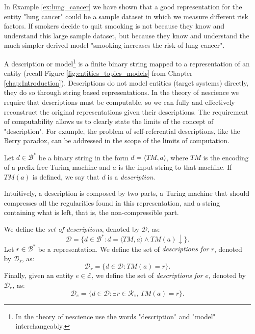 \begin{example}
In Example \ref{ex:lung_cancer} we have shown that a good representation for the entity "lung cancer" could be a sample dataset in which we measure different risk factors. If smokers decide to quit smooking is not because they know and understand this large sample dataset, but because they know and understand the much simpler derived model "smooking increases the risk of lung cancer".
\end{example}

A description or model\footnote{In the theory of nescience use the words "description" and "model" interchangeably.} is a finite binary string mapped to a representation of an entity (recall Figure \ref{fig:entities_topics_models} from Chapter \ref{chap:Introduction}). Descriptions do not model entities (target systems) directly, they do so through string based representations. In the theory of nescience we require that descriptions must be computable, so we can fully and effectively reconstruct the original representations given their descriptions. The requirement of computability allows us to clearly state the limits of the concept of "description". For example, the problem of self-referential descriptions, like the Berry paradox, can be addressed in the scope of the limits of computation.

\begin{definition} [Model]
\label{def:descriptions_model}
Let $d \in \mathcal{B}^\ast$ be a binary string in the form $d = \langle TM,a \rangle$, where $TM$ is the encoding of a prefix free Turing machine and $a$ is the input string to that machine. If $TM(a)$ is defined, we say that $d$ is a \emph{description}. 
\end{definition}

Intuitively, a description is composed by two parts, a Turing machine that should compresses all the regularities found in this representation, and a string containing what is left, that is, the non-compressible part.

\begin{definition}
\label{def:descriptions_model}
We define the \emph{set of descriptions}, denoted by $\mathcal{D}$, as:
\[
\mathcal{D} = \{ d \in \mathcal{B}^\ast : d = \langle TM,a \rangle \wedge TM(a) \downarrow \}.
\]
Let $r \in \mathcal{B}^\ast$ be a representation. We define the set of \emph{descriptions for $r$}, denoted by $\mathcal{D}_r$, as:
\[
\mathcal{D}_r = \{ d \in \mathcal{D} : TM(a) = r \}.
\]
Finally, given an entity $e \in \mathcal{E}$, we define the set of \emph{descriptions for $e$}, denoted by $\mathcal{D}_e$, as:
\[
\mathcal{D}_e = \{ d \in \mathcal{D} : \exists r \in \mathcal{R}_e,\, TM(a) = r \}.
\]
\end{definition}

